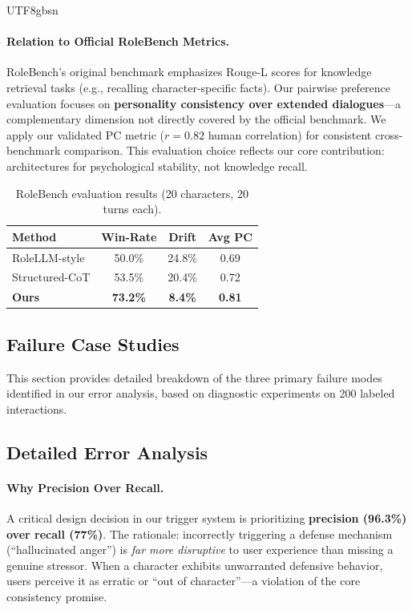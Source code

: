 \documentclass[11pt]{article}
\begin{document}
\begin{CJK*}{UTF8}{gbsn}
\paragraph{Relation to Official RoleBench Metrics.} RoleBench's original benchmark \citep{wang2024rolellm} emphasizes Rouge-L scores for knowledge retrieval tasks (e.g., recalling character-specific facts). Our pairwise preference evaluation focuses on \textbf{personality consistency over extended dialogues}---a complementary dimension not directly covered by the official benchmark. We apply our validated PC metric ($r=0.82$ human correlation) for consistent cross-benchmark comparison. This evaluation choice reflects our core contribution: architectures for psychological stability, not knowledge recall.

\begin{table}[h]
\centering
\small
\begin{tabular}{lccc}
\toprule
\textbf{Method} & \textbf{Win-Rate} & \textbf{Drift} & \textbf{Avg PC} \\
\midrule
RoleLLM-style & 50.0\% & 24.8\% & 0.69 \\
Structured-CoT & 53.5\% & 20.4\% & 0.72 \\
\textbf{Ours} & \textbf{73.2\%} & \textbf{8.4\%} & \textbf{0.81} \\
\bottomrule
\end{tabular}
\caption{RoleBench evaluation results (20 characters, 20 turns each).}
\label{tab:rolebench}
\end{table}

\subsection{Failure Case Studies}
\label{sec:failure_cases}

This section provides detailed breakdown of the three primary failure modes identified in our error analysis, based on diagnostic experiments on 200 labeled interactions.

\subsection{Detailed Error Analysis}

\paragraph{Why Precision Over Recall.} A critical design decision in our trigger system is prioritizing \textbf{precision (96.3\%) over recall (77\%)}. The rationale: incorrectly triggering a defense mechanism (``hallucinated anger'') is \textit{far more disruptive} to user experience than missing a genuine stressor. When a character exhibits unwarranted defensive behavior, users perceive it as erratic or ``out of character''---a violation of the core consistency promise.


\end{CJK*}
\end{document}
